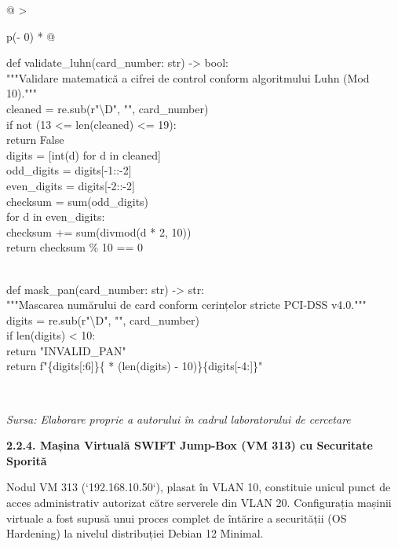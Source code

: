 \documentclass[
]{article}
\begin{document}
\begin{longtable}[]{@{}
  >{\raggedright\arraybackslash}p{(\columnwidth - 0\tabcolsep) * }@{}}
\toprule\noalign{}
\begin{minipage}[b]{\linewidth}\raggedright
def validate\_luhn(card\_number: str) -\textgreater{} bool:\\
"""Validare matematică a cifrei de control conform algoritmului Luhn
(Mod 10)."""\\
cleaned = re.sub(r"\textbackslash D", "", card\_number)\\
if not (13 \textless= len(cleaned) \textless= 19):\\
return False\\
digits = {[}int(d) for d in cleaned{]}\\
odd\_digits = digits{[}-1::-2{]}\\
even\_digits = digits{[}-2::-2{]}\\
checksum = sum(odd\_digits)\\
for d in even\_digits:\\
checksum += sum(divmod(d * 2, 10))\\
return checksum \% 10 == 0\\
\strut \\
def mask\_pan(card\_number: str) -\textgreater{} str:\\
"""Mascarea numărului de card conform cerințelor stricte PCI-DSS
v4.0."""\\
digits = re.sub(r"\textbackslash D", "", card\_number)\\
if len(digits) \textless{} 10:\\
return "INVALID\_PAN"\\
return f"\{digits{[}:6{]}\}\{\textquotesingle*\textquotesingle{} *
(len(digits) - 10)\}\{digits{[}-4:{]}\}"\strut
\end{minipage} \\
\midrule\noalign{}
\endhead
\bottomrule\noalign{}
\endlastfoot
\end{longtable}

\emph{Sursa: Elaborare proprie a autorului în cadrul laboratorului de
cercetare}

\textbf{2.2.4. Mașina Virtuală SWIFT Jump-Box (VM 313) cu Securitate
Sporită}

Nodul VM 313 (`192.168.10.50`), plasat în VLAN 10, constituie unicul
punct de acces administrativ autorizat către serverele din VLAN 20.
Configurația mașinii virtuale a fost supusă unui proces complet de
întărire a securității (OS Hardening) la nivelul distribuției Debian 12
Minimal.
\end{document}
